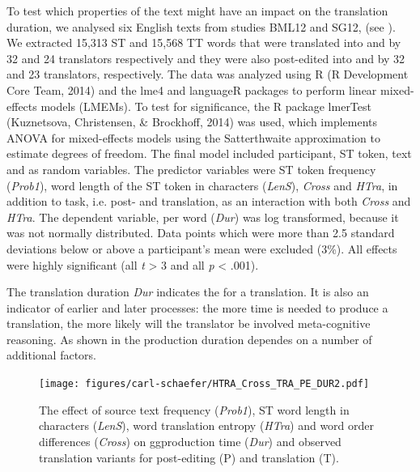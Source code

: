 \documentclass[output=paper]{LSP/langsci}
\begin{document}
To test which properties of the text might have an impact on the translation duration, we analysed six English texts from studies BML12 and SG12, (see ). We extracted 15,313 ST and 15,568 TT words that were translated into  and  by 32 and 24 translators respectively and they were also post-edited into  and  by 32 and 23 translators, respectively. The data was analyzed using R (R Development Core Team, 2014) and the lme4 \citep{Bates2014} and languageR \citep{Baayen2013} packages to perform linear mixed-effects models (LMEMs). To test for significance, the R package lmerTest (Kuznetsova, Christensen, \& Brockhoff, 2014) was used, which implements ANOVA for mixed-effects models using the Satterthwaite approximation to estimate degrees of freedom. The final model included participant, ST token, text and  as random variables. The predictor variables were ST token frequency (\textit{Prob1}), word length of the ST token in characters (\textit{LenS}), \textit{Cross} and \textit{HTra}, in addition to task, i.e. post- and translation, as an interaction with both \textit{Cross} and \textit{HTra}. The dependent variable,  per word (\textit{Dur}) was log transformed, because it was not normally distributed. Data points which were more than 2.5 standard deviations below or above a participant's mean were excluded (3\%). All effects were highly significant (all \textit{t} {\textgreater} 3 and all \textit{p} {\textless} .001).

 
The translation duration \textit{Dur} indicates the  for a translation. It is also an indicator of earlier and later processes: the more time is needed to produce a translation, the more likely will the translator be involved meta-cognitive reasoning. As shown in  the production duration dependes on a number of additional factors.

\begin{figure}[p] 
\texttt{[image: figures/carl-schaefer/HTRA\_Cross\_TRA\_PE\_DUR2.pdf]} 
\caption{The effect of source text frequency (\textit{Prob1}), ST word length in characters (\textit{LenS}), word
translation entropy (\textit{HTra}) and word order differences (\textit{Cross}) on gg{production time} (\textit{Dur}) and
observed translation variants for post-editing (P) and translation (T).}
\label{carl-schaeffer:fig:stfreq}
\end{figure}
\end{document}
